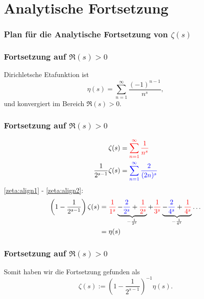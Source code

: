 \documentclass[ngerman, aspectratio=169]{beamer}
\newcommand*{\RD}{\textcolor{red}}
\newcommand*{\BL}{\textcolor{blue}}
\begin{document}
    \section{Analytische Fortsetzung}
    \begin{frame}
        \frametitle{Plan für die Analytische Fortsetzung von $\zeta(s)$}
    \end{frame}
    \begin{frame}
        \frametitle{Fortsetzung auf $\Re(s) > 0$}
        Dirichletsche Etafunktion ist
        \begin{equation*}\label{zeta:equation:eta}
            \eta(s)
            =
            \sum_{n=1}^{\infty}
            \frac{(-1)^{n-1}}{n^s},
        \end{equation*}
        und konvergiert im Bereich $\Re(s) > 0$.
    \end{frame}
    \begin{frame}
        \frametitle{Fortsetzung auf $\Re(s) > 0$}
        \begin{align}
            \zeta(s)
            &=
            \RD{
            \sum_{n=1}^{\infty}
            \frac{1}{n^s} \label{zeta:align1}
            }
            \\
            \frac{1}{2^{s-1}}
            \zeta(s)
            &=
            \BL{
            \sum_{n=1}^{\infty}
            \frac{2}{(2n)^s} \label{zeta:align2}
            }
        \end{align}
        \pause
        \eqref{zeta:align1} - \eqref{zeta:align2}:
        \begin{align*}
            \left(1 - \frac{1}{2^{s-1}} \right)
            \zeta(s)
            &=
            \RD{\frac{1}{1^s}}
            \underbrace{-\BL{\frac{2}{2^s}} + \RD{\frac{1}{2^s}}}_{-\frac{1}{2^s}}
            + \RD{\frac{1}{3^s}}
            \underbrace{-\BL{\frac{2}{4^s}} + \RD{\frac{1}{4^s}}}_{-\frac{1}{4^s}}
            \ldots
            \\
            &= \eta(s)
        \end{align*}
    \end{frame}
    \begin{frame}
        \frametitle{Fortsetzung auf $\Re(s) > 0$}
        Somit haben wir die Fortsetzung gefunden als
        \begin{equation} \label{zeta:equation:fortsetzung1}
            \zeta(s)
            :=
            \left(1 - \frac{1}{2^{s-1}} \right)^{-1} \eta(s).
        \end{equation}
    \end{frame}
\end{document}
